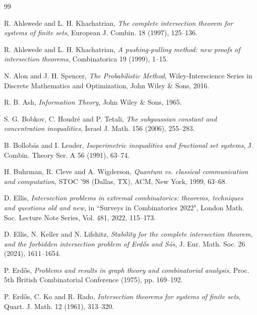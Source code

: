 \documentclass[10pt]{amsart}
\theoremstyle{remark}
\begin{document}

\begin{thebibliography}{99}

 R. Ahlswede and L. H. Khachatrian,
\textit{The complete intersection theorem for systems of finite sets},
European J. Combin. 18 (1997), 125--136.

 R. Ahlswede and L. H. Khachatrian,
\textit{A pushing-pulling method: new proofs of intersection theorems},
Combinatorica 19 (1999), 1--15.

 N. Alon and J. H. Spencer,
\textit{The Probabilistic Method},
Wiley-Interscience Series in Discrete Mathematics and Optimization, John Wiley \& Sons, 2016.

 R. B. Ash,
\textit{Information Theory},
John Wiley \& Sons, 1965.

 S. G. Bobkov, C. Houdr{\'{e}} and P. Tetali,
\emph{The subgaussian constant and concentration inequalities},
Israel J. Math. 156 (2006), 255--283.

 B. Bollob{\'{a}}s and I. Leader,
\emph{Isoperimetric inequalities and fractional set systems},
J. Combin. Theory Ser. A 56 (1991), 63--74.

 H. Buhrman, R. Cleve and A. Wigderson,
\emph{Quantum vs. classical communication and computation},
STOC ’98 (Dallas, TX), ACM, New York, 1999, 63--68.

 D. Ellis,
\emph{Intersection problems in extremal combinatorics: theorems, techniques and questions old and new},
in ``Surveys in Combinatorics 2022", London Math. Soc. Lecture Note Series, Vol. 481,
2022, 115--173.

 D. Ellis, N. Keller and N. Lifshitz,
\emph{Stability for the complete intersection theorem, and the forbidden intersection problem
of Erd\H{o}s and S\'{o}s}, J. Eur. Math. Soc. 26 (2024), 1611--1654.

 P. Erd\H{o}s,
\emph{Problems and results in graph theory and combinatorial analysis},
Proc. 5th British Combinatorial Conference (1975), pp. 169--192.

 P. Erd\H{o}s, C. Ko and R. Rado,
\emph{Intersection theorems for systems of finite sets},
Quart. J. Math. 12 (1961), 313--320.


\end{thebibliography}
\end{document}
